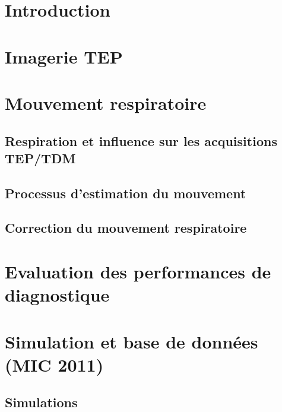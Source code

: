 \documentclass[12pt]{book}
\begin{document}
\part{Introduction}

\part{Imagerie TEP}
		
			

\part{Mouvement respiratoire}
%	

	\chapter{Respiration et influence sur les acquisitions TEP/TDM}
	
	
	\chapter{Processus d'estimation du mouvement}
	
	
	\chapter{Correction du mouvement respiratoire}
	

\part{Evaluation des performances de diagnostique}
	



\part{Simulation et base de données (MIC 2011)}
	\label{lab:bdd}
	\chapter{Simulations}
\end{document}
